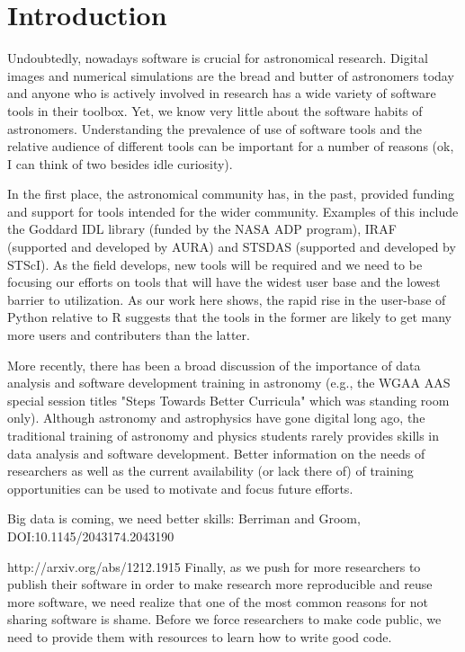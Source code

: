 \section{Introduction}

Undoubtedly, nowadays software is crucial for astronomical research. Digital images and numerical simulations are the bread and butter of astronomers today and anyone who is actively involved in research has a wide variety of software tools in their toolbox. Yet, we know very little about the software habits of astronomers. Understanding the prevalence of use of software tools and the relative audience of different tools can be important for a number of reasons (ok, I can think of two besides idle curiosity).

In the first place, the astronomical community has, in the past, provided funding and support for tools intended for the wider community. Examples of this include the Goddard IDL library (funded by the NASA ADP program), IRAF (supported and developed by AURA) and STSDAS (supported and developed by STScI). As the field develops, new tools will be required and we need to be focusing our efforts on tools that will have the widest user base and the lowest barrier to utilization. As our work here shows, the rapid rise in the user-base of Python relative to R suggests that the tools in the former are likely to get many more users and contributers than the latter. 

More recently, there has been a broad discussion of the importance of data analysis and software development training in astronomy (e.g., the WGAA AAS special session titles "Steps Towards Better Curricula" which was standing room only). Although astronomy and astrophysics have gone digital long ago, the traditional training of astronomy and physics students rarely provides skills in data analysis and software development. Better information on the needs of researchers as well as the current availability (or lack there of) of training opportunities can be used to motivate and focus future efforts. 

Big data is coming, we need better skills: Berriman and Groom, DOI:10.1145/2043174.2043190

http://arxiv.org/abs/1212.1915
Finally, as we push for more researchers to publish their software in order to make research more reproducible and reuse more software, we need realize that one of the most common reasons for not sharing software is shame. Before we force researchers to make code public, we need to provide them with resources to learn how to write good code. 

